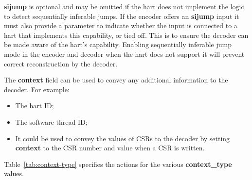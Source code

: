 \textbf{sijump} is optional and may be omitted if the hart does not implement the logic to detect
sequentially inferable jumps.  If the encoder offers an \textbf{sijump} input it must also provide a
parameter to indicate whether the input is connected to a hart that implements this capability, or
tied off.  This is to ensure the decoder can be made aware of the hart's capability.  Enabling 
sequentially inferable jump mode in the encoder and decoder when the hart does not support it will
prevent correct reconstruction by the decoder. 

The \textbf{context} field can be used to convey any additional information to the decoder.  For example:

\begin{itemize}
  \item The hart ID;
  \item The software thread ID;
  \item It could be used to convey the values of CSRs to the decoder by setting \textbf{context} to the 
    CSR number and value when a CSR is written.
\end{itemize}

Table~\ref{tab:context-type} specifies the actions for the various \textbf{context\_type} values.

